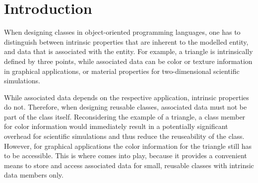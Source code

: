 
\chapter*{Introduction}   

When designing classes in object-oriented programming languages,
one has to distinguish between intrinsic properties that are inherent to the modelled entity,
and data that is associated with the entity. For example, a triangle is intrinsically defined
by three points, while associated data can be color or texture information in graphical applications, or material properties for two-dimensional scientific simulations.

While associated data depends on the respective application, intrinsic properties do not.
Therefore, when designing reusable classes, associated data must not be part of the class itself.
Reconsidering the example of a triangle, a class member for color information would immediately result in
a potentially significant overhead for scientific simulations and thus reduce the reuseability of the class.
However, for graphical applications the color information for the triangle still has to be accessible. This is where
{\ViennaData} comes into play, because it provides a convenient means to store and access associated data
for small, reusable classes with intrinsic data members only.

